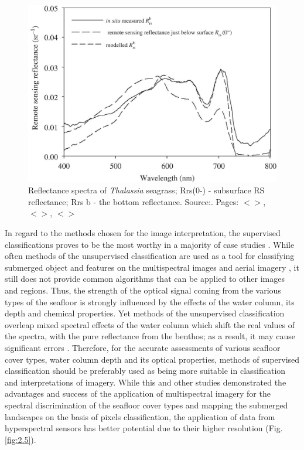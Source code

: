 \documentclass[11pt]{article}
\begin{document}
\begin{figure}
	\centering
	\includegraphics[scale=0.15]{Fig-15.jpg}
	\caption{Reflectance spectra of \textit{Thalassia} seagrass; Rrs(0-) - subsurface RS reflectance; Rrs b - the bottom
		reflectance. Source:\cite{Yang10}\label{Yang10}. Pages: $<$\pageref{page-21}$>$, $<$\pageref{page-22}$>$, $<$\pageref{page-54}$>$}
	\label{fig:2.6}
\end{figure}

In regard to the methods chosen for the image interpretation, the supervised classifications proves to
be the most worthy in a majority of case studies \cite{Palandro03,Peneva08}\label{Palandro03}\label{Peneva08}. While
often methods of the unsupervised classification are used as a tool for classifying submerged object
and features on the multispectral images and aerial imagery \cite{Fletcher09}\label{Fletcher09}, it still does not
provide common algorithms that can be applied to other images and regions. Thus, the strength of the
optical signal coming from the various types of the seafloor is strongly influenced by the effects of the
water column, its depth and chemical properties. Yet methods of the unsupervised classification
overleap mixed spectral effects of the water column which shift the real values of the spectra, with the
pure reflectance from the benthos; as a result, it may cause significant errors \cite{Dierssen03}\label{Dierssen03}.
Therefore, for the accurate assessments of various seafloor cover types, water
column depth and its optical properties, methods of supervised classification should be preferably
used as being more suitable in classification and interpretations of imagery.
While this and other studies \cite{Phinn08}\label{Phinn08} demonstrated the advantages and success of the
application of multispectral imagery for the spectral discrimination of the seafloor cover types and
mapping the submerged landscapes on the basis of pixels classification, the application of data from
hyperspectral sensors has better potential due to their higher resolution (Fig.\ref{fig:2.5})\label{page-20}.
\end{document}
